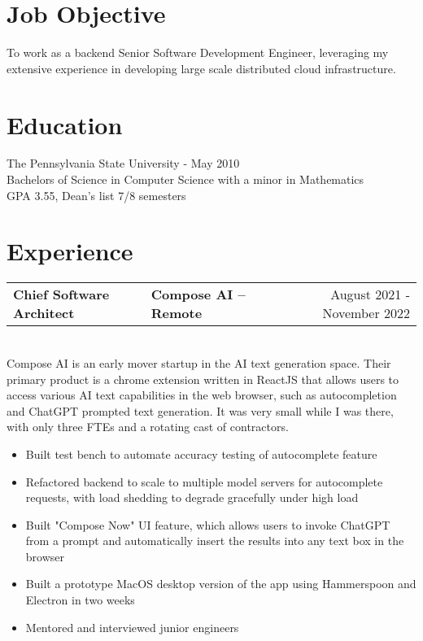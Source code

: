 \documentclass{res}
\newlength{\vsep}
\begin{document}
 


\vspace{-24pt}
\address{bennet.huber@gmail.com\\(215) 490-4297}
\address{1219 NW Richmond Beach Rd\\Shoreline, WA 98177}

\begin{resume}

\section{Job Objective}
    To work as a backend Senior Software Development Engineer, leveraging my extensive experience in developing large scale distributed cloud infrastructure.
 
\section{Education}
    The Pennsylvania State University - May 2010\\
    Bachelors of Science in Computer Science with a minor in Mathematics\\
    GPA 3.55, Dean's list 7/8 semesters

\section{Experience}
   \begin{tabularx}{\textwidth}{@{}>{\bf}l>{\large\bf\centering\arraybackslash}Xr@{}}
   Chief Software Architect & Compose AI -- Remote & August 2021 - November 2022\vspace{\vsep}\\
   \end{tabularx}\\
   Compose AI is an early mover startup in the AI text generation space.  Their primary product is a chrome extension written in ReactJS that allows users to access various AI text capabilities in the web browser, such as autocompletion and ChatGPT prompted text generation.  It was very small while I was there, with only three FTEs and a rotating cast of contractors.
   \begin{itemize}
   \item Built test bench to automate accuracy testing of autocomplete feature
   \item Refactored backend to scale to multiple model servers for autocomplete requests, with load shedding to degrade gracefully under high load
   \item Built "Compose Now" UI feature, which allows users to invoke ChatGPT from a prompt and automatically insert the results into any text box in the browser
   \item Built a prototype MacOS desktop version of the app using Hammerspoon and Electron in two weeks
   \item Mentored and interviewed junior engineers
   \end{itemize}
   \vspace{\vsep}


\end{resume}
\end{document}
